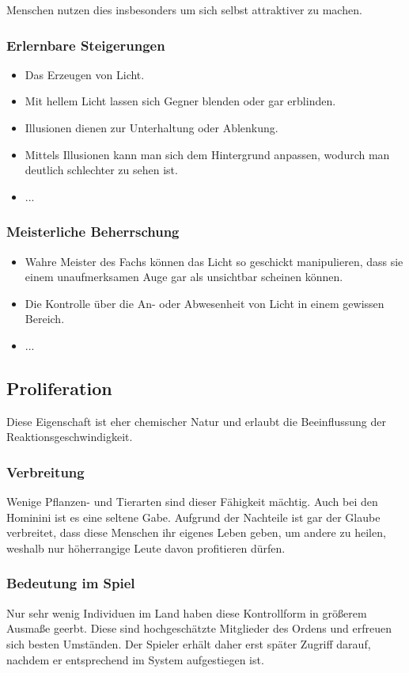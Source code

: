 Menschen nutzen dies insbesonders um sich selbst attraktiver zu machen.

\subsubsection{Erlernbare Steigerungen}
\begin{itemize}
	\item Das Erzeugen von Licht.
	\item Mit hellem Licht lassen sich Gegner blenden oder gar erblinden.
	\item Illusionen dienen zur Unterhaltung oder Ablenkung.
	\item Mittels Illusionen kann man sich dem Hintergrund anpassen, wodurch man deutlich schlechter zu sehen ist.
	\item ...
\end{itemize}

\subsubsection{Meisterliche Beherrschung} 
\begin{itemize}
	\item Wahre Meister des Fachs können das Licht so geschickt manipulieren, dass sie einem unaufmerksamen Auge gar als unsichtbar scheinen können.
	\item Die Kontrolle über die An- oder Abwesenheit von Licht in einem gewissen Bereich.
	\item ...
\end{itemize}



\subsection{Proliferation}\label{sec:proliferationsmagie}
Diese Eigenschaft ist eher chemischer Natur und erlaubt die Beeinflussung der Reaktionsgeschwindigkeit.

\subsubsection{Verbreitung}
Wenige Pflanzen- und Tierarten sind dieser Fähigkeit mächtig. Auch bei den Hominini ist es eine seltene Gabe. Aufgrund der Nachteile ist gar der Glaube verbreitet, dass diese Menschen ihr eigenes Leben geben, um andere zu heilen, weshalb nur höherrangige Leute davon profitieren dürfen.

\subsubsection{Bedeutung im Spiel}
Nur sehr wenig Individuen im Land haben diese Kontrollform in größerem Ausmaße geerbt. Diese sind hochgeschätzte Mitglieder des Ordens und erfreuen sich besten Umständen. Der Spieler erhält daher erst später Zugriff darauf, nachdem er entsprechend im System aufgestiegen ist.

